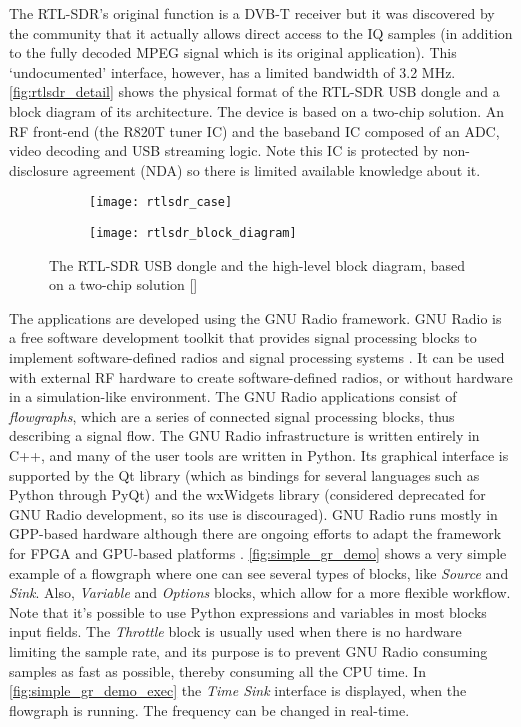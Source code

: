 The RTL-SDR's original function is a DVB-T receiver but it was discovered by the community that it actually allows direct access to the IQ samples (in addition to the fully decoded MPEG signal which is its original application). This `undocumented' interface, however, has a limited bandwidth of 3.2 MHz. \autoref{fig:rtlsdr_detail} shows the physical format of the RTL-SDR USB dongle and a block diagram of its architecture. The device is based on a two-chip solution. An RF front-end (the R820T tuner IC) and the baseband IC composed of an ADC, video decoding and USB streaming logic. Note this IC is protected by non-disclosure agreement (NDA) so there is limited available knowledge about it.

\begin{figure} [ht]
  \begin{subfigure}{.5\textwidth}
    \centering
    \texttt{[image: rtlsdr\_case]}
    \label{fig:rtlsdr_case}
  \end{subfigure}
  \begin{subfigure}{.5\textwidth}
    \centering
    \texttt{[image: rtlsdr\_block\_diagram]}
    \label{fig:rtlsdr_block_diagram}
  \end{subfigure}
  \caption{The RTL-SDR USB dongle and the high-level block diagram, based on a two-chip solution [\citeauthor{rtlsdr_product}]}
  \label{fig:rtlsdr_detail}
\end{figure}

The applications are developed using the GNU Radio framework. GNU Radio is a free software development toolkit that provides signal processing blocks to implement software-defined radios and signal processing systems \cite{gnuradio_project}. It can be used with external RF hardware to create software-defined radios, or without hardware in a simulation-like environment. The GNU Radio applications consist of \emph{flowgraphs}, which are a series of connected signal processing blocks, thus describing a signal flow. The GNU Radio infrastructure is written entirely in C++, and many of the user tools are written in Python. Its graphical interface is supported by the Qt library (which as bindings for several languages such as Python through PyQt) and the wxWidgets library (considered deprecated for GNU Radio development, so its use is discouraged). GNU Radio runs mostly in GPP-based hardware although there are ongoing efforts to adapt the framework for FPGA and GPU-based platforms \cite{gr2020_program}.
\autoref{fig:simple_gr_demo} shows a very simple example of a flowgraph where one can see several types of blocks, like \emph{Source} and \emph{Sink}. Also, \emph{Variable} and \emph{Options} blocks, which allow for a more flexible workflow. Note that it's possible to use Python expressions and variables in most blocks input fields. The \emph{Throttle} block is usually used when there is no hardware limiting the sample rate, and its purpose is to prevent GNU Radio consuming samples as fast as possible, thereby consuming all the CPU time. In \autoref{fig:simple_gr_demo_exec} the \emph{Time Sink} interface is displayed, when the flowgraph is running. The frequency can be changed in real-time.

